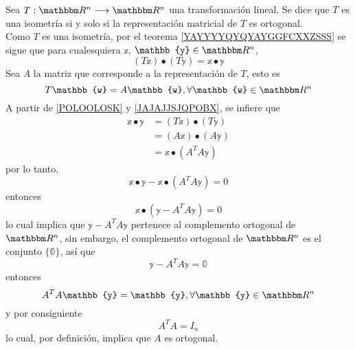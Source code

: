 \begin{theorem}\label{torto_qorto}
    Sea $T:\RR[n] \longrightarrow \RR[n]$ una transformación lineal. Se dice que $T$ es una isometría si y solo si la representación matricial de $T$ es ortogonal. \\
    \demostracion Como $T$ es una isometría, por el teorema \ref{YAYYYYQYQYAYGGFCXXZSSS} se sigue que para cualesquiera $\mathbb{x}$, $\mathbb{y} \in \RR[n]$,
    \begin{equation}
        (T\mathbb{x}) \bullet (T\mathbb{y}) = \mathbb{x} \bullet \mathbb{y} \label{POLOOLOSK}
    \end{equation}
    Sea $A$ la matriz que corresponde a la representación de $T$, esto es
    \begin{equation}
        T\mathbb{w} = A\mathbb{w}, \forall \mathbb{w} \in \RR[n] \label{JAJAJJSJQPOBX}
    \end{equation}
    A partir de \eqref{POLOOLOSK} y \eqref{JAJAJJSJQPOBX}, se infiere que
    \begin{align*}
        \mathbb{x} \bullet \mathbb{y} & = (T\mathbb{x}) \bullet (T\mathbb{y}) \\
        & = (A\mathbb{x}) \bullet (A\mathbb{y}) \\
        & = \mathbb{x} \bullet \left( A^TA\mathbb{y} \right)
    \end{align*}
    por lo tanto,
    $$\mathbb{x} \bullet \mathbb{y} - \mathbb{x} \bullet \left( A^TA\mathbb{y} \right) = 0$$
    entonces
    $$\mathbb{x} \bullet \left( \mathbb{y} - A^TA\mathbb{y} \right) = 0$$
    lo cual implica que $\mathbb{y} - A^TA\mathbb{y}$ pertenece al complemento ortogonal de $\RR[n]$, sin embargo, el complemento ortogonal de $\RR[n]$ es el conjunto $\{ \mathbb{0} \}$, así que
    $$\mathbb{y} - A^TA\mathbb{y} = \mathbb{0}$$\newpage\noindent
    entonces
    $$A^TA\mathbb{y} = \mathbb{y}, \forall \mathbb{y} \in \RR[n]$$
    y por consiguiente
    $$A^TA = I_n$$
    lo cual, por definición, implica que  $A$ es ortogonal.
\end{theorem}


